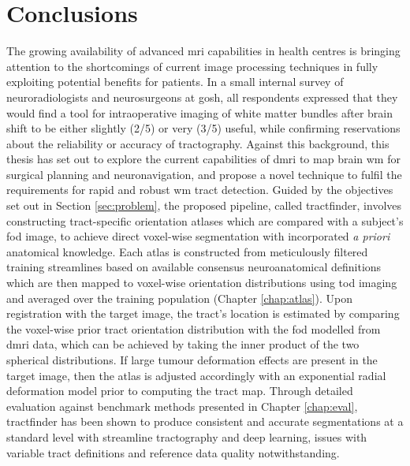 \chapter{Conclusions}
\label{chapterlabel6}

The growing availability of advanced \gls{mri} capabilities in health centres is bringing attention to the shortcomings of current image processing techniques in fully exploiting potential benefits for patients.
In a small internal survey of neuroradiologists and neurosurgeons at \gls{gosh}, all respondents expressed that they would find a tool for intraoperative imaging of white matter bundles after brain shift to be either slightly (2/5) or very (3/5) useful, while confirming reservations about the reliability or accuracy of tractography.
Against this background, this thesis has set out to explore the current capabilities of \gls{dmri} to map brain \gls{wm} for surgical planning and neuronavigation, and propose a novel technique to fulfil the requirements for rapid and robust \gls{wm} tract detection.
Guided by the objectives set out in Section \ref{sec:problem}, the proposed pipeline, called tractfinder, involves constructing tract-specific orientation atlases which are compared with a subject's \gls{fod} image, to achieve direct voxel-wise segmentation with incorporated \textit{a priori} anatomical knowledge.
Each atlas is constructed from meticulously filtered training streamlines based on available consensus neuroanatomical definitions which are then mapped to voxel-wise orientation distributions using \gls{tod} imaging and averaged over the training population (Chapter \ref{chap:atlas}).
Upon registration with the target image, the tract's location is estimated by comparing the voxel-wise prior tract orientation distribution with the \gls{fod} modelled
from \gls{dmri} data, which can be achieved by taking the inner product of the two spherical distributions.
If large tumour deformation effects are present in the target image, then the atlas is adjusted accordingly with an exponential radial deformation model prior to computing the tract map.
Through detailed evaluation against benchmark methods presented in Chapter \ref{chap:eval}, tractfinder has been shown to produce consistent and accurate segmentations at a standard level with streamline tractography and deep learning, issues with variable tract definitions and reference data quality notwithstanding.

